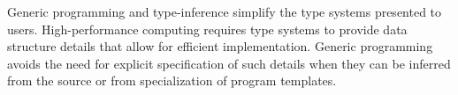 Generic programming and type-inference simplify the
type systems presented to users. High-performance computing
requires type systems to provide data structure details
that allow for efficient implementation. Generic programming
avoids the need for explicit specification of such
details when they can be inferred from the source or from
specialization of program templates.
